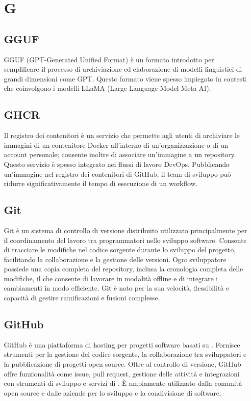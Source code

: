 \section{G}

\vspace{2em}
\subsection*{GGUF}
\par GGUF (GPT-Generated Unified Format) è un formato introdotto per semplificare il processo di archiviazione ed elaborazione di modelli linguistici di grandi dimensioni come GPT. Questo formato viene spesso impiegato in contesti che coinvolgono i modelli LLaMA (Large Language Model Meta AI).

\vspace{2em}
\subsection*{GHCR}
\par Il registro dei contenitori è un servizio che permette agli utenti di archiviare le immagini di un contenitore Docker all'interno di un'organizzazione o di un account personale; consente inoltre di associare un'immagine a un repository. Questo servizio è spesso integrato nei flussi di lavoro DevOps. Pubblicando un'immagine nel registro dei contenitori di GitHub, il team di sviluppo può ridurre significativamente il tempo di esecuzione di un workflow.

\vspace{2em}
\subsection*{Git}
\par Git è un sistema di controllo di versione distribuito utilizzato principalmente per il coordinamento del lavoro tra programmatori nello sviluppo software. Consente di tracciare le modifiche nel codice sorgente durante lo sviluppo del progetto, facilitando la collaborazione e la gestione delle versioni. Ogni sviluppatore possiede una copia completa del repository, inclusa la cronologia completa delle modifiche, il che consente di lavorare in modalità offline e di integrare i cambiamenti in modo efficiente. Git è noto per la sua velocità, flessibilità e capacità di gestire ramificazioni e fusioni complesse.

\vspace{2em}
\subsection*{GitHub}
\par GitHub è una piattaforma di hosting per progetti software basati su . Fornisce strumenti per la gestione del codice sorgente, la collaborazione tra sviluppatori e la pubblicazione di progetti open source. Oltre al controllo di versione, GitHub offre funzionalità come issue, pull request, gestione delle attività e integrazioni con strumenti di sviluppo e servizi di . È ampiamente utilizzato dalla comunità open source e dalle aziende per lo sviluppo e la condivisione di software.

